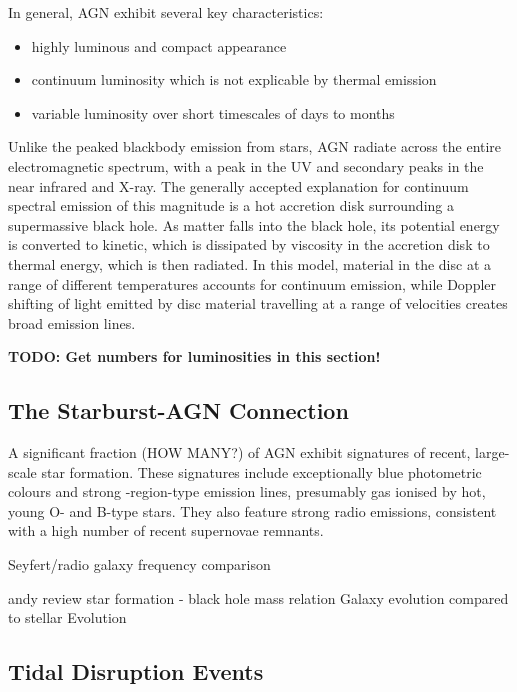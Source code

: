 \documentclass[a4paper,11pt]{article}
\begin{document}
In general, AGN exhibit several key characteristics:

\begin{itemize}
    \item highly luminous and compact appearance
    \item continuum luminosity which is not explicable by thermal emission
    \item variable luminosity over short timescales of days to months
\end{itemize}

Unlike the peaked blackbody emission from stars, AGN radiate across the entire electromagnetic spectrum, with a peak in the UV and secondary peaks in the near infrared and X-ray. The generally accepted explanation for continuum spectral emission of this magnitude is a hot accretion disk surrounding a supermassive black hole.\cite{Peterson_1997} As matter falls into the black hole, its potential energy is converted to kinetic, which is dissipated by viscosity in the accretion disk to thermal energy, which is then radiated. In this model, material in the disc at a range of different temperatures accounts for continuum emission, while Doppler shifting of light emitted by disc material travelling at a range of velocities creates broad emission lines.\cite{McClure_2019}

\textbf{TODO: Get numbers for luminosities in this section!}

\subsection{The Starburst-AGN Connection}\label{sec:starburst_agn_connection}

A significant fraction (HOW MANY?) of AGN exhibit signatures of recent, large-scale star formation. These signatures include exceptionally blue photometric colours and strong -region-type emission lines, presumably gas ionised by hot, young O- and B-type stars. They also feature strong radio emissions, consistent with a high number of recent supernovae remnants.\cite{Peterson_1997}

Seyfert/radio galaxy frequency comparison

andy review
star formation - black hole mass relation\cite{Veilleux_2008}
\cite{Mo_2010}
Galaxy evolution compared to stellar Evolution
\subsection{Tidal Disruption Events}\label{sec:tidal_disruption_events}
\end{document}
